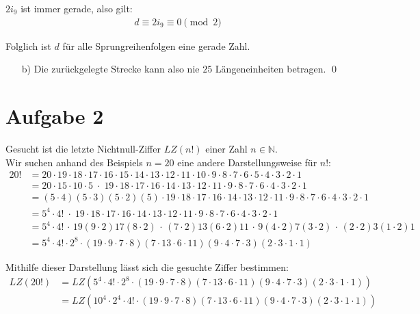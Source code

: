 \documentclass[12pt,a4paper,oneside]{article}
\begin{document}
$2 i_9$ ist immer gerade, also gilt:
\begin{align*}
	d \equiv 2 i_9 \equiv 0 \pmod 2
\end{align*}

Folglich ist $d$ für alle Sprungreihenfolgen eine gerade Zahl.
\begin{itemize}
	\item[b)] Die zurückgelegte Strecke kann also nie $25$ Längeneinheiten betragen. \qed
\end{itemize}

\pagebreak
\section[]{Aufgabe 2}
\setlength{\mathindent}{0.5cm}

Gesucht ist die letzte Nichtnull-Ziffer $LZ(n!)$ einer Zahl $n \in \mathbb{N}$. \\
Wir suchen anhand des Beispiels $n=20$ eine andere Darstellungsweise für $n!$:
\begin{equation*}
	\begin{split}
		20! &= 20\cdot19\cdot18\cdot17\cdot16\cdot15\cdot14\cdot13\cdot12\cdot11\cdot10\cdot9\cdot8\cdot7\cdot6\cdot5\cdot4\cdot3\cdot2\cdot1 \\
		&= 20\cdot15\cdot10\cdot5 \;\cdot\; 19\cdot18\cdot17\cdot16\cdot14\cdot13\cdot12\cdot11\cdot9\cdot8\cdot7\cdot6\cdot4\cdot3\cdot2\cdot1 \\
		&= (5\cdot4)(5\cdot3)(5\cdot2)(5) \cdot 19\cdot18\cdot17\cdot16\cdot14\cdot13\cdot12\cdot11\cdot9\cdot8\cdot7\cdot6\cdot4\cdot3\cdot2\cdot1 \\
		&= 5^4 \cdot 4! \;\cdot\; 19\cdot18\cdot17\cdot16\cdot14\cdot13\cdot12\cdot11\cdot9\cdot8\cdot7\cdot6\cdot4\cdot3\cdot2\cdot1 \\
		&= 5^4 \cdot 4! \,\cdot\, 19(9\cdot2)17(8\cdot2)\,\cdot\,(7\cdot2)13(6\cdot2)11\,\cdot\,9(4\cdot2)7(3\cdot2)\,\cdot\,(2\cdot2)3(1\cdot2)1 \\
		&= 5^4 \cdot 4! \cdot 2^8 \cdot (19\cdot9\cdot7\cdot8)(7\cdot13\cdot6\cdot11)(9\cdot4\cdot7\cdot3)(2\cdot3\cdot1\cdot1)
	\end{split}
\end{equation*}

Mithilfe dieser Darstellung lässt sich die gesuchte Ziffer bestimmen:
\begin{equation*}
	\begin{split}
		LZ(20!) &= LZ\left(5^4 \cdot 4! \cdot 2^8 \cdot (19\cdot9\cdot7\cdot8)(7\cdot13\cdot6\cdot11)(9\cdot4\cdot7\cdot3)(2\cdot3\cdot1\cdot1)\right) \\
		&= LZ\left(10^4 \cdot 2^4 \cdot 4! \cdot (19\cdot9\cdot7\cdot8)(7\cdot13\cdot6\cdot11)(9\cdot4\cdot7\cdot3)(2\cdot3\cdot1\cdot1)\right) \\
	\end{split}
\end{equation*}
\end{document}
